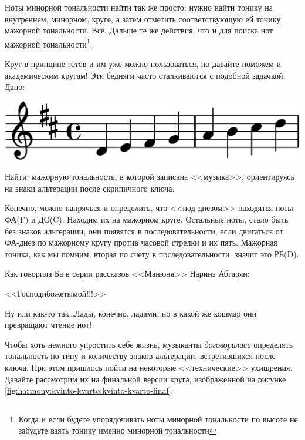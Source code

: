 Ноты минорной тональности найти так же просто: нужно найти тонику на внутреннем, минорном, круге, а затем отметить соответствующую ей тонику мажорной тональности. Всё. Дальше те же действия, что и для поиска нот мажорной тональности\footnote{Когда и если будете упорядочивать ноты минорной тональности по высоте не забудьте взять тонику именно минорной тональности}.

Круг в принципе готов и им уже можно пользоваться, но давайте поможем и академическим кругам! Эти бедняги часто сталкиваются с подобной задачкой. Дано:

\begin{center}    
    \includegraphics{fig/kvinto-kvarto/tonality-d-maj}
\end{center}

Найти: мажорную тональность, в которой записана <<музыка>>, ориентируясь на знаки альтерации после скрипичного ключа.

Конечно, можно напрячься и определить, что <<под диезом>> находятся ноты ФА(F) и ДО(C). Находим их на мажорном круге. Остальные ноты, стало быть без знаков альтерации, они появятся в последовательности, если двигаться от ФА-диез по мажорному кругу против часовой стрелки и их пять. Мажорная тоника, как мы помним, вторая по счету в последовательности: значит это РЕ(D).

Как говорила Ба в серии рассказов <<Манюня>> Наринэ Абгарян: 
\begin{center}
<<Господибожетымой!!!>> 
\end{center}

Ну или как-то так\ldots Лады, конечно, ладами, но в какой же кошмар они превращают чтение нот!

Чтобы хоть немного упростить себе жизнь, музыканты \emph{договорились} определять тональность по типу и количеству знаков альтерации, встретившихся после ключа. При этом пришлось пойти на некоторые <<технические>> ухищрения. Давайте рассмотрим их на финальной версии круга, изображенной на рисунке \ref{fig:harmony:kvinto-kvarto:kvinto-kvarto-final}.

